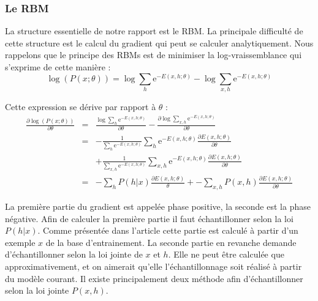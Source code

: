 \documentclass[10pt,a4paper]{article}
\begin{document}
\subsubsection{Le RBM}


La structure essentielle de notre rapport est le RBM. La principale difficulté de cette structure est le calcul du gradient qui peut se calculer analytiquement. Nous rappelons que le principe des RBMs est de minimiser la log-vraissemblance qui s'exprime de cette manière :
\begin{equation}
	\log \left( P(x; \theta) \right) = \log \sum_h \mathrm{e}^{-E(x, h; \theta)} - \log \sum_{x, h} \mathrm{e}^{-E(x, h; \theta)}
\end{equation}


Cette expression se dérive par rapport à $\theta$ :
\begin{equation}
	\begin{array}{rll}
		 \displaystyle\frac{\partial \log \left ( P(x; \theta) \right )}{\partial \theta} & = & \displaystyle\frac{\log \sum_h \mathrm{e}^{-E(x, h; \theta)}}{\partial \theta} - \frac{\partial \log \sum_{x, h} \mathrm{e}^{-E(x, h; \theta)}}{\partial \theta} \\
		 &=&  \displaystyle-\frac{1}{\sum_h \mathrm{e}^{-E(x, h; \theta)}} \sum_h \mathrm{e}^{-E(x, h; \theta)} \frac{\partial E(x, h; \theta)}{\partial\theta} \\
		 & &  \displaystyle+ \frac{1}{\sum_{x, h} \mathrm{e}^{-E(x, h; \theta)}} \sum_{x, h} \mathrm{e}^{-E(x, h; \theta)} \frac{\partial E(x, h; \theta)}{\partial\theta} \\
		 &=&  \displaystyle- \sum_{h} P(h|x) \frac{\partial E(x, h; \theta)}{\theta} + - \sum_{x, h} P(x, h) \frac{\partial E(x, h; \theta)}{\partial\theta} 
	\end{array}
\end{equation}


La première partie du gradient est appelée phase positive, la seconde est la phase négative. Afin de calculer la première partie il faut échantillonner selon la loi $P(h|x)$. Comme présentée dans l'article \cite{HIN1984} cette partie est calculé à partir d'un exemple $x$ de la base d'entrainement. La seconde partie en revanche demande d'échantillonner selon la loi jointe de $x$ et $h$. Elle ne peut être calculée que approximativement, et on aimerait qu'elle l'échantillonnage soit réalisé à partir du modèle courant. Il existe principalement deux méthode afin d'échantillonner selon la loi jointe $P(x, h)$.
\end{document}
